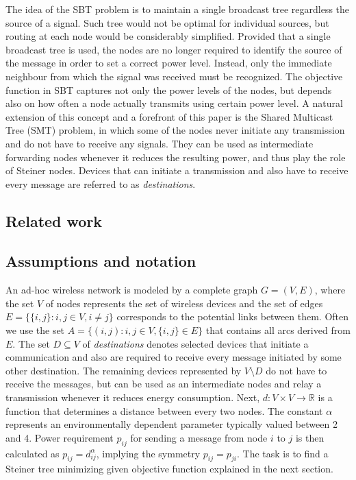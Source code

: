 The idea of the SBT problem is to maintain a single broadcast tree regardless the source of a signal. Such tree would not be optimal for individual sources, but routing at each node would be considerably simplified. Provided that a single broadcast tree is used, the nodes are no longer required to identify the source of the message in order to set a correct power level. Instead, only the immediate neighbour from which the signal was received must be recognized. The objective function in SBT captures not only the power levels of the nodes, but depends also on how often a node actually transmits using certain power level. A natural extension of this concept and a forefront of this paper is the Shared Multicast Tree (SMT) problem, in which some of the nodes never initiate any transmission and do not have to receive any signals. They can be used as intermediate forwarding nodes whenever it reduces the resulting power, and thus play the role of Steiner nodes. Devices that can initiate a transmission and also have to receive every message are referred to as \emph{destinations}.

\subsection{Related work}
\subsection{Assumptions and notation}
An ad-hoc wireless network is modeled by a complete graph $G=(V,E)$, where the set $V$ of nodes represents the set of wireless devices and the set of edges $E=\{\{i,j\}:i,j\in V, i\neq j\}$ corresponds to the potential links between them. Often we use the set $A=\{(i,j):i,j\in V,\{i,j\}\in E\}$ that contains all arcs derived from $E$. The set $D\subseteq V$ of \emph{destinations} denotes selected devices that initiate a communication and also are required to receive every message initiated by some other destination. The remaining devices represented by $V\setminus D$ do not have to receive the messages, but can be used as an intermediate nodes and relay a transmission whenever it reduces energy consumption. Next, $d: V\times V\rightarrow \mathbb{R}$ is a function that determines a distance between every two nodes. The constant $\alpha$ represents an environmentally dependent parameter typically valued between 2 and 4. Power requirement $p_{ij}$ for sending a message from node $i$ to $j$ is then calculated as $p_{ij}=d^{\alpha}_{ij}$, implying the symmetry $p_{ij}=p_{ji}$. The task is to find a Steiner tree minimizing given objective function explained in the next section.

